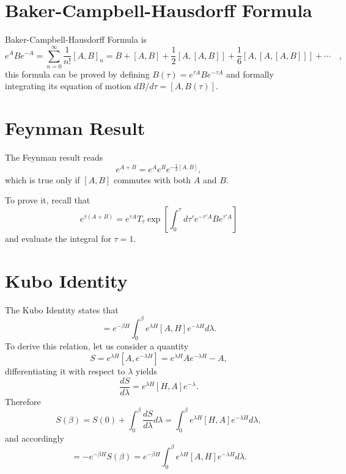 \documentclass{book}
\numberwithin{equation}{section}
\begin{document}
\section{Baker-Campbell-Hausdorff Formula}
Baker-Campbell-Hausdorff Formula is
\begin{equation}
  e^ABe^{-A}=\sum_{n=0}^\infty\frac{1}{n!}[A,B]_n=
  B+[A,B]+\frac{1}{2}[A,[A,B]]+\frac{1}{6}[A,[A,[A,B]]]+\cdots\quad,
\end{equation}
this formula can be proved by defining $B(\tau)=e^{\tau A}Be^{-\tau A}$
and formally integrating its equation of motion $dB/d\tau=[A,B(\tau)]$.

\section{Feynman Result}
The Feynman result reads
\begin{equation}
  e^{A+B}=e^Ae^Be^{-\frac{1}{2}[A,B]},
\end{equation}
which is true only if $[A,B]$ commutes with both $A$ and $B$.

To prove it, recall that
\begin{equation}
e^{\tau(A+B)}=e^{\tau A}T_\tau\exp\left[
  \int_0^\tau d\tau'e^{-\tau'A}Be^{\tau'A}\right]
\end{equation}
and evaluate the integral for $\tau=1$.

\section{Kubo Identity}
The Kubo Identity states that
\begin{equation}
  [e^{-\beta H},A]=e^{-\beta H}\int_0^\beta 
  e^{\lambda H}[A,H]e^{-\lambda H}d\lambda.
\end{equation}
To derive this relation, let us consider a quantity 
\begin{equation}
  S=e^{\lambda H}[A,e^{-\lambda H}]=e^{\lambda H}Ae^{-\lambda H}-A,
\end{equation}
differentiating it with respect to $\lambda$ yields
\begin{equation}
  \frac{dS}{d\lambda}=e^{\lambda H}[H,A]e^{-\lambda}.
\end{equation}
Therefore
\begin{equation}
  S(\beta)=S(0)+\int_0^\beta\frac{dS}{d\lambda}d\lambda=
  \int_0^\beta e^{\lambda H}[H,A]e^{-\lambda H}d\lambda,
\end{equation}
and accordingly
\begin{equation}
  [e^{-\beta H},A]=-e^{-\beta H}S(\beta)=e^{-\beta H}\int_0^\beta 
  e^{\lambda H}[A,H]e^{-\lambda H}d\lambda.
\end{equation}
\end{document}
